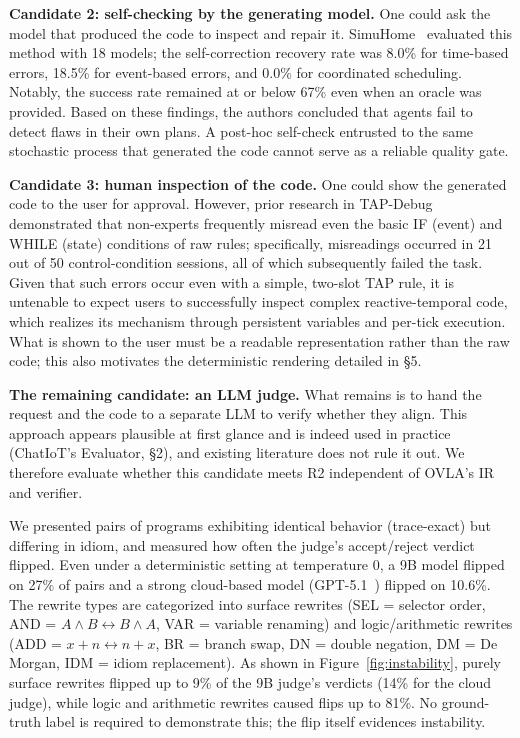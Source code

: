 \documentclass[sigconf,nonacm,anonymous,review]{acmart}
\begin{document}
\textbf{Candidate 2: self-checking by the generating model.} One could ask the model that produced the code to inspect and repair it. SimuHome~\cite{simuhome} evaluated this method with 18 models; the self-correction recovery rate was 8.0\% for time-based errors, 18.5\% for event-based errors, and 0.0\% for coordinated scheduling. Notably, the success rate remained at or below 67\% even when an oracle was provided. Based on these findings, the authors concluded that agents fail to detect flaws in their own plans. A post-hoc self-check entrusted to the same stochastic process that generated the code cannot serve as a reliable quality gate.

\textbf{Candidate 3: human inspection of the code.} One could show the generated code to the user for approval. However, prior research in TAP-Debug~\cite{tapdebug} demonstrated that non-experts frequently misread even the basic IF (event) and WHILE (state) conditions of raw rules; specifically, misreadings occurred in 21 out of 50 control-condition sessions, all of which subsequently failed the task. Given that such errors occur even with a simple, two-slot TAP rule, it is untenable to expect users to successfully inspect complex reactive-temporal code, which realizes its mechanism through persistent variables and per-tick execution. What is shown to the user must be a readable representation rather than the raw code; this also motivates the deterministic rendering detailed in \S5.

\textbf{The remaining candidate: an LLM judge.} What remains is to hand the request and the code to a separate LLM to verify whether they align. This approach appears plausible at first glance and is indeed used in practice (ChatIoT's Evaluator, \S2), and existing literature does not rule it out. We therefore evaluate whether this candidate meets R2 independent of OVLA's IR and verifier.

We presented pairs of programs exhibiting identical behavior (trace-exact) but differing in idiom, and measured how often the judge's accept/reject verdict flipped. Even under a deterministic setting at temperature 0, a 9B model flipped on 27\% of pairs and a strong cloud-based model (GPT-5.1~\cite{gpt51}) flipped on 10.6\%. The rewrite types are categorized into surface rewrites (SEL = selector order, AND = $A{\wedge}B{\leftrightarrow}B{\wedge}A$, VAR = variable renaming) and logic/arithmetic rewrites (ADD = $x{+}n{\leftrightarrow}n{+}x$, BR = branch swap, DN = double negation, DM = De Morgan, IDM = idiom replacement). As shown in Figure~\ref{fig:instability}, purely surface rewrites flipped up to 9\% of the 9B judge's verdicts (14\% for the cloud judge), while logic and arithmetic rewrites caused flips up to 81\%. No ground-truth label is required to demonstrate this; the flip itself evidences instability.
\end{document}
